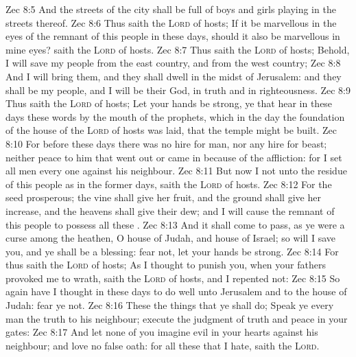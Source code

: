 \vs Zec 8:5 And the streets of the city shall be full of boys and girls playing in the streets thereof.
\vs Zec 8:6 Thus saith the \textsc{Lord} of hosts; If it be marvellous in the eyes of the remnant of this people in these days, should it also be marvellous in mine eyes? saith the \textsc{Lord} of hosts.
\vs Zec 8:7 Thus saith the \textsc{Lord} of hosts; Behold, I will save my people from the east country, and from the west country;
\vs Zec 8:8 And I will bring them, and they shall dwell in the midst of Jerusalem: and they shall be my people, and I will be their God, in truth and in righteousness.
\vs Zec 8:9 Thus saith the \textsc{Lord} of hosts; Let your hands be strong, ye that hear in these days these words by the mouth of the prophets, which  in the day  the foundation of the house of the \textsc{Lord} of hosts was laid, that the temple might be built.
\vs Zec 8:10 For before these days there was no hire for man, nor any hire for beast; neither  peace to him that went out or came in because of the affliction: for I set all men every one against his neighbour.
\vs Zec 8:11 But now I  not  unto the residue of this people as in the former days, saith the \textsc{Lord} of hosts.
\vs Zec 8:12 For the seed  prosperous; the vine shall give her fruit, and the ground shall give her increase, and the heavens shall give their dew; and I will cause the remnant of this people to possess all these .
\vs Zec 8:13 And it shall come to pass,  as ye were a curse among the heathen, O house of Judah, and house of Israel; so will I save you, and ye shall be a blessing: fear not,  let your hands be strong.
\vs Zec 8:14 For thus saith the \textsc{Lord} of hosts; As I thought to punish you, when your fathers provoked me to wrath, saith the \textsc{Lord} of hosts, and I repented not:
\vs Zec 8:15 So again have I thought in these days to do well unto Jerusalem and to the house of Judah: fear ye not.
\vs Zec 8:16 These  the things that ye shall do; Speak ye every man the truth to his neighbour; execute the judgment of truth and peace in your gates:
\vs Zec 8:17 And let none of you imagine evil in your hearts against his neighbour; and love no false oath: for all these  that I hate, saith the \textsc{Lord}.
